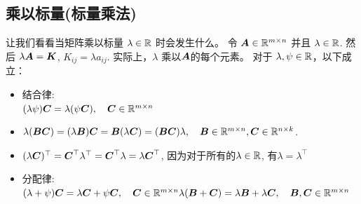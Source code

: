 \subsection{乘以标量(标量乘法)}

让我们看看当矩阵乘以标量 $\lambda \in \mathbb{R}$ 时会发生什么。
令 $\boldsymbol{A} \in \mathbb{R}^{m \times n}$ 并且 $\lambda \in \mathbb{R}$.
然后 $\lambda\boldsymbol{A} = \boldsymbol{K}$, $K_{ij} = \lambda a_{ij}$.
实际上，$\lambda$ 乘以$\boldsymbol{A}$的每个元素。
对于 $\lambda, \psi \in \mathbb{R}$，以下成立：

\begin{itemize}
    \item 结合律:\\ $(\lambda\psi)\boldsymbol{C} = \lambda(\psi\boldsymbol{C}), \quad \boldsymbol{C} \in \mathbb{R} ^{m \times n}$
    \item
    $
    \lambda (\boldsymbol{B}\boldsymbol{C}) =
    (\lambda\boldsymbol{B}) \boldsymbol{C} =
    \boldsymbol{B}(\lambda \boldsymbol{C}) =
    (\boldsymbol{B}\boldsymbol{C}) \lambda,
    \quad
    \boldsymbol{B} \in \mathbb{R}^{m \times n},
    \boldsymbol{C} \in \mathbb{R}^{n \times k}
    $.
    \item
    $
    (\lambda \boldsymbol{C})^\top =
    \boldsymbol{C}^\top \lambda^\top =
    \boldsymbol{C}^\top \lambda =
    \lambda \boldsymbol{C}^\top
    $, 因为对于所有的$\lambda \in \mathbb{R}$, 有$\lambda = \lambda^\top$
    \item 分配律:\\
    $
    (\lambda + \psi) \boldsymbol{C} = \lambda \boldsymbol{C} + \psi \boldsymbol{C},\quad \boldsymbol{C} \in \mathbb{R}^{m \times n}\\
    \lambda(\boldsymbol{B} + \boldsymbol{C}) = \lambda \boldsymbol{B} + \lambda \boldsymbol{C}, \quad \boldsymbol{B}, \boldsymbol{C} \in \mathbb{R}^{m \times n}
    $
\end{itemize}

